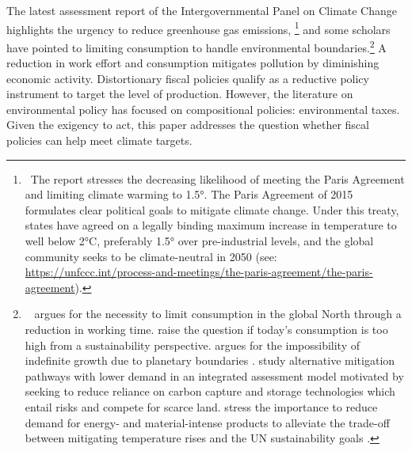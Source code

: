 The latest assessment report of the Intergovernmental Panel on Climate Change \citep{IPCC2022} highlights the urgency to reduce greenhouse gas emissions,%
\footnote{ \  The report stresses the decreasing likelihood of meeting the Paris Agreement and limiting climate warming to 1.5°. The Paris Agreement of 2015 formulates clear political goals to mitigate climate change. Under this treaty, states have agreed on a legally binding maximum increase in temperature to well below 2°C, preferably 1.5° over pre-industrial levels, and the global community seeks to be climate-neutral in 2050  (see: \url{https://unfccc.int/process-and-meetings/the-paris-agreement/the-paris-agreement}). 
}
and some scholars have pointed to limiting consumption to handle environmental boundaries.\footnote{\ \cite{Schor2005SustainableReduction} argues for the necessity to limit consumption in the global North through a reduction in working time. \cite{Arrow2004AreMuch} raise the question if today's consumption is too high from a sustainability perspective. \cite{Dasgupta2021}  argues for the impossibility of indefinite growth due to planetary boundaries  \citep{Rockstrom2009AHumanity}. %
	 \cite{VanVuuren2018AlternativeTechnologies} study alternative mitigation pathways with lower demand %
	 in an integrated assessment model motivated by seeking to reduce reliance on carbon capture and storage technologies which entail risks and compete for scarce land. \cite{Bertram2018TargetedScenarios} stress the importance to reduce demand for energy- and material-intense products to alleviate the trade-off between mitigating temperature rises  and the UN sustainability goals%
	. } A reduction in work effort and consumption mitigates pollution by diminishing economic activity. Distortionary fiscal policies qualify as a reductive policy instrument to target the level of production.
However, the literature on environmental policy has focused on compositional policies: environmental taxes. %
Given the exigency to act, this paper addresses the question whether fiscal policies can help meet climate targets. %


